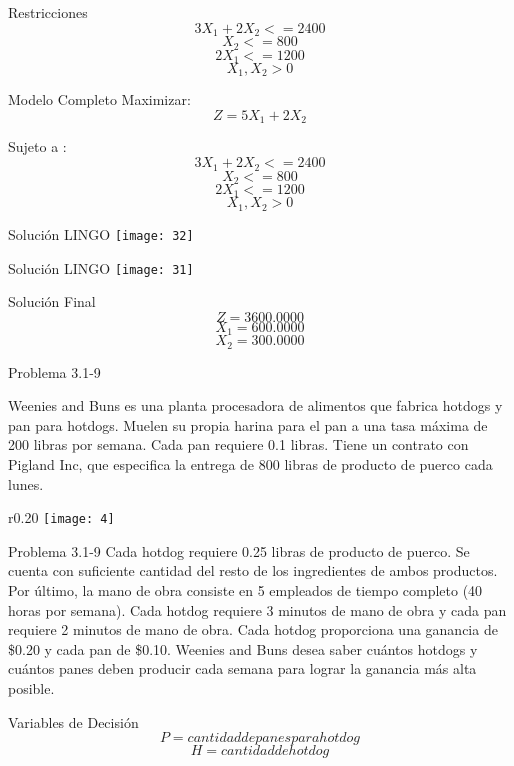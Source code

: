 \documentclass{beamer}
\begin{document}
\begin{frame}[fragile]{Restricciones}
\[3X_{1} + 2X_{2} <= 2400\]
\[X_{2} <= 800\]
\[2X_{1} <= 1200\]
\[X_{1}, X_{2} > 0\]

\end{frame}

\begin{frame}[fragile]{Modelo Completo}
Maximizar:\\
\[Z = 5X_{1} + 2X_{2}\]

Sujeto a :\\
\[3X_{1} + 2X_{2} <= 2400\]
\[X_{2} <= 800\]
\[2X_{1} <= 1200\]
\[X_{1}, X_{2} > 0\]
\end{frame}

\begin{frame}[fragile]{Solución LINGO}
    \texttt{[image: 32]}
\end{frame}
\begin{frame}[fragile]{Solución LINGO}
    \texttt{[image: 31]}
\end{frame}

\begin{frame}[fragile]{Solución Final}
\[Z = 3 600.0000\]
\[X_{1} = 600.0000\]
\[X_{2} = 300.0000\]
\end{frame}

\begin{frame}[t,fragile]{Problema  3.1-9}

Weenies and Buns es una planta procesadora de alimentos que fabrica hotdogs y pan para hotdogs. Muelen su propia harina para el pan a una tasa máxima de 200 libras por semana. Cada pan requiere 0.1 libras. Tiene un contrato con Pigland Inc, que especifica la entrega de 800 libras de producto de puerco cada lunes.
\begin{wrapfigure}{r}{0.20\textwidth}
    \centering
    \texttt{[image: 4]}
\end{wrapfigure}
\end{frame}

\begin{frame}[t,fragile]{Problema  3.1-9}
Cada hotdog requiere 0.25 libras de producto de puerco. Se cuenta con suficiente cantidad del resto de los ingredientes de ambos productos. Por último, la mano de obra consiste en 5 empleados de tiempo completo (40 horas por semana). Cada hotdog requiere 3 minutos de mano de obra y cada pan requiere 2 minutos de mano de obra. Cada hotdog proporciona una ganancia de \$0.20 y cada pan de \$0.10. Weenies and Buns desea saber cuántos hotdogs y cuántos panes deben producir cada semana para lograr la ganancia más alta posible.
\end{frame}
\begin{frame}[fragile]{Variables de Decisión}
\[P = cantidad de panes para hot dog\]
\[H = cantidad de hot dog\]

\end{frame}
\end{document}
